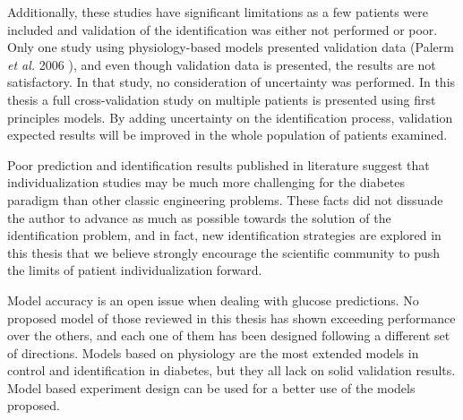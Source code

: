 Additionally, these studies have significant limitations as a few patients were included and validation of the identification was either not performed or poor. Only one study using physiology-based models presented validation data (Palerm \textit{et al.} 2006 \cite{palerm2006robust}), and even though validation data is presented, the results are not satisfactory. In that study, no consideration of uncertainty was performed. In this thesis a full cross-validation study on multiple patients is presented using first principles models. By adding uncertainty on the identification process, validation expected results will be improved in the whole population of patients examined.

Poor prediction and identification results published in literature suggest that individualization studies may be much more challenging for the diabetes paradigm than other classic engineering problems. These facts did not dissuade the author to advance as much as possible towards the solution of the identification problem, and in fact, new identification strategies are explored in this thesis that we believe strongly encourage the scientific community to push the limits of patient individualization forward. %


Model accuracy is an open issue when dealing with glucose predictions. No proposed model of those reviewed in this thesis has shown exceeding performance over the others, and each one of them has been designed following a different set of directions. Models based on physiology are the most extended models in control and identification in diabetes, but they all lack on solid validation results. Model based experiment design can be used for a better use of the models proposed.

